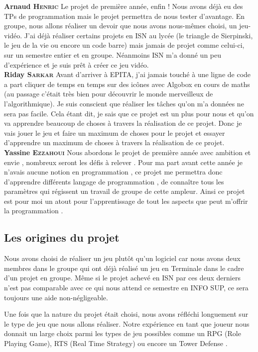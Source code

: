 \documentclass[a4paper, 12pt]{article}
\begin{document}
	\parindent=0cm\textbf{Arnaud \textsc{Henric}}
	\smallbreak
	Le projet de première année, enfin ! Nous avons déjà eu des TPs de programmation mais le projet permettra de nous tester d’avantage. En groupe, nous allons réaliser un devoir que nous avons nous-mêmes choisi, un jeu-vidéo. J’ai déjà réaliser certains projets en ISN au lycée (le triangle de Sierpinski, le jeu de la vie ou encore un code barre) mais jamais de projet comme celui-ci, sur un semestre entier et en groupe. Néanmoins ISN m’a donné un peu d'expérience et je suis prêt à créer ce jeu vidéo.\\
\newpage	
	\parindent=0cm\textbf{Riday \textsc{Sarkar}}
	\smallbreak
 Avant d’arriver à EPITA,  j'ai jamais touché à une ligne de code a part cliquer de temps en temps sur des icônes avec Algobox en cours de maths (au passage c'était très bien pour découvrir  le monde merveilleux de l’algorithmique). Je suis conscient que réaliser les tâches qu’on m’a données ne sera pas facile. Cela étant dit, je sais que ce projet est un plus pour nous et qu’on va apprendre beaucoup de choses à travers la réalisation de ce projet. Donc je vais jouer le jeu et faire un maximum de choses pour le projet et essayer d’apprendre un maximum de choses à travers la réalisation de ce projet.\\

	\parindent=0cm\textbf{Yassine \textsc{Ezzahoui}}
	\smallbreak
	Nous abordons  le projet de première année avec ambition et envie , nombreux seront les défis à relever . Pour ma part avant cette année je n’avais aucune notion en programmation , ce projet me permettra donc d’apprendre différents langage de programmation ,  de connaître tous les paramètres qui régissent un travail de groupe de cette ampleur. Ainsi ce  projet est pour moi  un atout pour l’apprentissage de tout les aspects que peut m’offrir la programmation .

	\parindent=0.5cm 
	\subsection{Les origines du projet}
Nous avons choisi de réaliser un jeu plutôt qu’un logiciel car nous avons deux membres dans le groupe qui ont déjà réalisé un jeu en Terminale dans le cadre d’un projet en groupe. Même si le projet achevé en ISN par ces deux derniers n’est pas comparable avec ce qui nous attend ce semestre en INFO SUP, ce sera toujours une aide non-négligeable.
\par Une fois que la nature du projet était choisi, nous avons réfléchi longuement sur le type de jeu que nous allons réaliser. Notre expérience en tant que joueur nous donnait un large choix parmi les types de jeu possibles comme un RPG (Role Playing Game), RTS (Real Time Strategy) ou encore un Tower Defense . 
\end{document}
